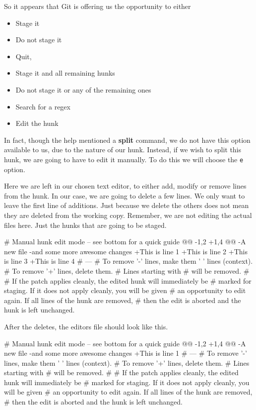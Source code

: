 So it appears that Git is offering us the opportunity to either
\begin{itemize}
\item Stage it
\item Do not stage it
\item Quit,
\item Stage it and all remaining hunks
\item Do not stage it or any of the remaining ones
\item Search for a regex
\item Edit the hunk
\end{itemize}

In fact, though the help mentioned a \textbf{split} command, we do not have this option available to us, due to the nature of our hunk.
Instead, if we wish to split this hunk, we are going to have to edit it manually.
To do this we will choose the \texttt{e} option.

Here we are left in our chosen text editor, to either add, modify or remove lines from the hunk.
In our case, we are going to delete a few lines.
We only want to leave the first line of additions.
Just because we delete the others does not mean they are deleted from the working copy.
Remember, we are not editing the actual files here.
Just the hunks that are going to be staged.

\begin{code}
# Manual hunk edit mode -- see bottom for a quick guide
@@ -1,2 +1,4 @@
-A new file
-and some more awesome changes
+This is line 1
+This is line 2
+This is line 3
+This is line 4
# ---
# To remove '-' lines, make them ' ' lines (context).
# To remove '+' lines, delete them.
# Lines starting with # will be removed.
#
# If the patch applies cleanly, the edited hunk will immediately be
# marked for staging. If it does not apply cleanly, you will be given
# an opportunity to edit again. If all lines of the hunk are removed,
# then the edit is aborted and the hunk is left unchanged.
\end{code}

After the deletes, the editors file should look like this.

\begin{code}
# Manual hunk edit mode -- see bottom for a quick guide
@@ -1,2 +1,4 @@
-A new file
-and some more awesome changes
+This is line 1
# ---
# To remove '-' lines, make them ' ' lines (context).
# To remove '+' lines, delete them.
# Lines starting with # will be removed.
#
# If the patch applies cleanly, the edited hunk will immediately be
# marked for staging. If it does not apply cleanly, you will be given
# an opportunity to edit again. If all lines of the hunk are removed,
# then the edit is aborted and the hunk is left unchanged.
\end{code}

